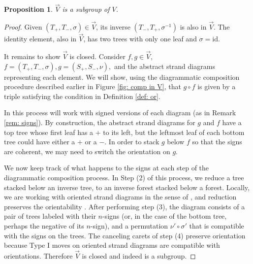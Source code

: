 \documentclass[11pt, twoside]{amsart}
\numberwithin{equation}{section}
\newtheorem{proposition}[theorem]{Proposition}
\theoremstyle{definition}
\numberwithin{equation}{section}
\begin{document}
\begin{proposition}
    $\vec{V}$ is a subgroup of $V$. 
\end{proposition}
\begin{proof} Given $(T_+,T_-,\sigma) \in \vec{V}$, its inverse $(T_-,T_+,\sigma^{-1})$ is also in $\vec{V}$. The identity element, also in $\vec{V}$, has two trees with only one leaf and $\sigma=\text{id}$.

It remains to show $\vec{V}$ is closed. Consider $f,g\in \vec{V}$, $f=(T_+,T_-,\sigma),g=(S_+,S_-,\nu),$ and the abstract strand diagrams representing each element. We will show, using the diagrammatic composition procedure described earlier in Figure \ref{fig: comp in V}, that $g \circ f$ is given by a triple satisfying the condition in Definition \ref{def: or}.

In this process will work with signed versions of each diagram (as in Remark \ref{rem: signs}). By construction, the abstract strand diagrams for $g$ and $f$ have a top tree whose first leaf has a $+$ to its left, but the leftmost leaf of each bottom tree could have either a $+$ or a $-$. In order to stack $g$ below $f$ so that the signs are coherent, we may need to switch the orientation on $g$. 

We now keep track of what happens to the signs at each step of the diagrammatic composition process.
In Step (2) of this process, we reduce a tree stacked below an inverse tree, to an inverse forest stacked below a forest. Locally, we are working with oriented strand diagrams in the sense of \cite[Definition 4.1]{KLL}, and reduction preserves the orientability \cite[Definition 4.4]{KLL}. After performing step (3), the diagram consists of a pair of trees labeled with their $n$-signs (or, in the case of the bottom tree, perhaps the negative of its $n$-sign), and a permutation $\nu' \circ \sigma'$ that is compatible with the signs on the trees. The canceling carets of step (4) preserve orientation because Type I moves on oriented strand diagrams are compatible with orientations. Therefore $\vec{V}$ is closed and indeed is a subgroup.
\end{proof}
\end{document}
